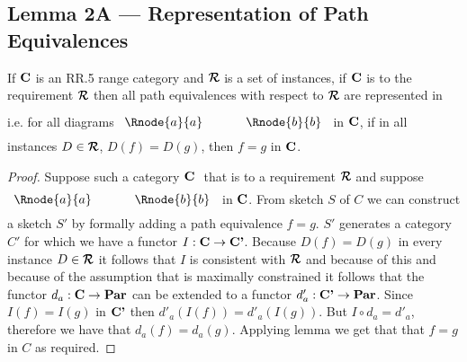 
\subsection{Lemma 2A --- Representation of Path Equivalences}

\begin{lemma}
If $\textbf{C}$ is an RR.5 range category and $\reqtc$ is a set of instances, 
if $\textbf{C}$ is 
 to the requirement $\reqtc$ then all path equivalences with respect
to $\reqtc$ are represented in \catcw
i.e. for all diagrams
$
\rule[-0.3cm]{0pt}{0.9cm} %
\begin{array}{c p{0.5cm} c  }
 \Rnode{a}{a}            &&   \Rnode{b}{b}
\end{array} 
$
in $\textbf{C}$,  if in all instances $D \in \reqtc$, $D(f)=D(g)$, 
then $f=g$ in $\textbf{C}$.
\end{lemma}
\begin{proof}
Suppose such a category  $\textbf{C}\ $  that  is 
 to a requirement $\reqtc$
and suppose 
$
\rule[-0.3cm]{0pt}{0.8cm} %
\begin{array}{c p{0.5cm} c  }
 \Rnode{a}{a}            &&   \Rnode{b}{b}
\end{array} 
$
in $\textbf{C}$. From sketch $S$ of $C$ we can construct a sketch $S'$ by formally adding a path equivalence $f=g$.
$S'$ generates a category $C'$ for which we have a functor $I: \textbf{C} \rightarrow \textbf{C'}$. 
Because $D(f) = D(g)$ in every instance $D \in \reqtc$
it follows that $I$ is consistent with $\reqtc$ and because 
of this and because of the assumption that \catcw is maximally constrained it follows that the functor $d_a: \textbf{C} \rightarrow \textbf{Par}$ 
can be extended to a functor $d'_a: \textbf{C'} \rightarrow \textbf{Par}$. 
Since $I(f)=I(g)$ in $\textbf{C'}$ then $d'_a(I(f))=d'_a(I(g))$. 
But $I \circ d_a = d'_a$, therefore we have that $d_a(f)=d_a(g)$. 
Applying lemma   we get that that $f=g$ in $C$ as required.
\end{proof}